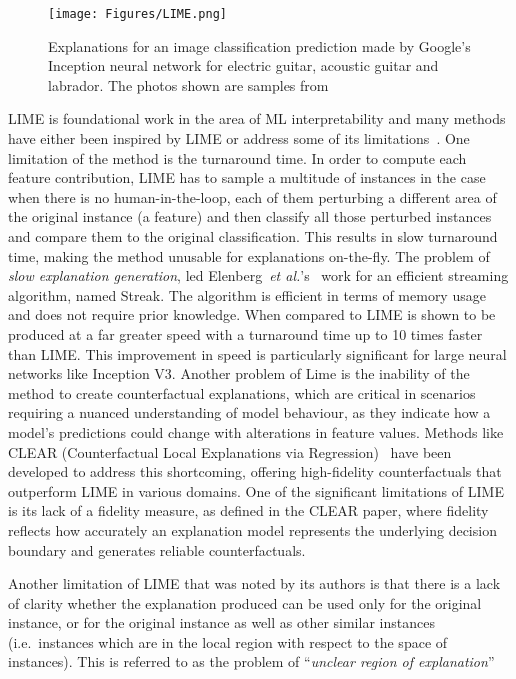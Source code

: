 \begin{figure}[ht!]
	\begin{center}
		\texttt{[image: Figures/LIME.png]}
	\end{center}
	\caption{Explanations for an image classification prediction made by Google’s Inception neural network for electric guitar, acoustic guitar and labrador. The photos shown are samples from~\cite{Ribeiro0G16}}
	\label{Fig:LIME}
\end{figure} 


LIME is foundational work in the area of ML interpretability and many methods have either been inspired by LIME or address some of its limitations~\cite{ElenbergDFK17, Ribeiro0G18, WhiteG20}. One limitation of the method is the turnaround time. In order to compute each feature contribution, LIME has to sample a multitude of instances in the case when there is no human-in-the-loop, each of them perturbing a different area of the original instance (a feature) and then classify all those perturbed instances and compare them to the original classification. This results in slow turnaround time, making the method unusable for explanations on-the-fly. The problem of \emph{slow explanation generation}, led Elenberg~\textit{et al.}'s~\cite{ElenbergDFK17} work for an efficient streaming algorithm, named Streak. The algorithm is efficient in terms of memory usage and does not require prior knowledge. When compared to LIME is shown to be produced at a far greater speed with a turnaround time up to 10 times faster than LIME. This improvement in speed is particularly significant for large neural networks like Inception V3. Another problem of Lime is the inability of the method to create counterfactual explanations, which are critical in scenarios requiring a nuanced understanding of model behaviour, as they indicate how a model's predictions could change with alterations in feature values. Methods like CLEAR (Counterfactual Local Explanations via Regression)~\cite{WhiteG20} have been developed to address this shortcoming, offering high-fidelity counterfactuals that outperform LIME in various domains. One of the significant limitations of LIME is its lack of a fidelity measure, as defined in the CLEAR paper, where fidelity reflects how accurately an explanation model represents the underlying decision boundary and generates reliable counterfactuals.

Another limitation of LIME that was noted by its authors is that there is a lack of clarity whether the explanation produced can be used only for the original instance, or for the original instance as well as other similar instances (i.e.\ instances which are in the local region with respect to the space of instances). This is referred to as the problem of ``\emph{unclear region of explanation}''

